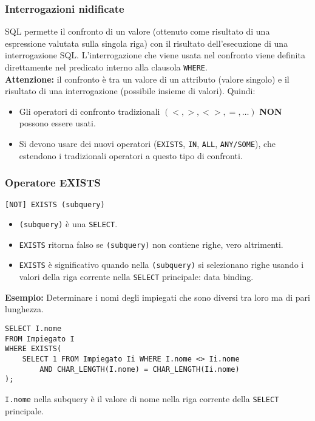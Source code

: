 \documentclass[a4paper, 10pt, titlepage]{article}
\begin{document}
	\subsubsection{Interrogazioni nidificate}
		SQL permette il confronto di un valore (ottenuto come risultato di una
		espressione valutata sulla singola riga) con il risultato dell’esecuzione di
		una interrogazione SQL. L’interrogazione che viene usata nel confronto viene definita
		direttamente nel predicato interno alla clausola \lstinline|WHERE|. \\
		\textbf{Attenzione: }il confronto è tra un valore di un attributo (valore singolo) e
		il risultato di una interrogazione (possibile insieme di valori). Quindi:
		\begin{itemize}
				\item Gli operatori di confronto tradizionali $ (<, >, <>, =, \dots) $ \textbf{NON} possono	essere usati.
				\item Si devono usare dei nuovi operatori (\lstinline|EXISTS|, \lstinline|IN|, 
				\lstinline|ALL|, \lstinline|ANY/SOME|), che estendono i tradizionali
				operatori a questo tipo di confronti.
			\end{itemize}
			
	\subsubsection*{Operatore EXISTS}
		\begin{lstlisting}
[NOT] EXISTS (subquery)
		\end{lstlisting}
		\begin{itemize}
		\item \lstinline|(subquery)| è una \lstinline|SELECT|.
		\item \lstinline|EXISTS| ritorna falso se \lstinline|(subquery)| non contiene righe, vero altrimenti.
		\item \lstinline|EXISTS| è significativo quando nella \lstinline|(subquery)| si selezionano righe
			usando i valori della riga corrente nella \lstinline|SELECT| principale: data binding.
		\end{itemize}
			\medskip
			\textbf{Esempio:} Determinare i nomi degli impiegati che sono diversi tra loro ma di pari lunghezza.
			\begin{lstlisting}[tabsize=4]
SELECT I.nome
FROM Impiegato I
WHERE EXISTS(
    SELECT 1 FROM Impiegato Ii WHERE I.nome <> Ii.nome
		AND CHAR_LENGTH(I.nome) = CHAR_LENGTH(Ii.nome)
);
			\end{lstlisting}
			\lstinline|I.nome| nella subquery è il valore di nome nella riga corrente della \lstinline|SELECT| principale.
			
\end{document}
